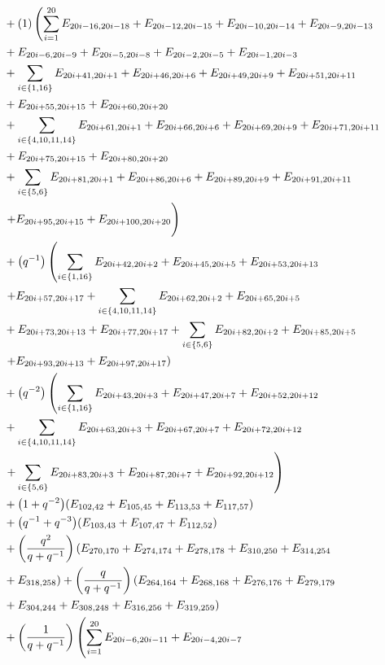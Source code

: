 \documentclass[10pt,a4paper]{amsart}
\numberwithin{equation}{section}
\theoremstyle{definition}
\begin{document}
\begin{align*}
&+(1)\left( \sum_{i=1}^{20} E_{20i-16,20i-18} + E_{20i-12,20i-15} + E_{20i-10,20i-14} + E_{20i-9,20i-13} \right. \\
&+ E_{20i-6,20i-9}+ E_{20i-5,20i-8} + E_{20i-2,20i-5} + E_{20i-1,20i-3}\\
&+\sum_{i \in \{1,16\}} E_{20i+41,20i+1} + E_{20i+46,20i+6} + E_{20i+49,20i+9} + E_{20i+51,20i+11} \\
&+ E_{20i+55,20i+15}+E_{20i+60,20i+20} \\
&+\sum_{i \in \{4,10,11,14\}} E_{20i+61,20i+1} + E_{20i+66,20i+6} + E_{20i+69,20i+9} + E_{20i+71,20i+11} \\
& + E_{20i+75,20i+15}+E_{20i+80,20i+20} \\
&+\sum_{i \in \{5,6\}} E_{20i+81,20i+1} + E_{20i+86,20i+6} + E_{20i+89,20i+9} + E_{20i+91,20i+11} \\
&\left.+ E_{20i+95,20i+15}+E_{20i+100,20i+20} \vphantom{\sum_{i=1}^{20}}\right) \\
&+\bigl(q^{-1}\bigr)\left( \sum_{i \in \{1,16\}} E_{20i+42,20i+2} + E_{20i+45,20i+5} + E_{20i+53,20i+13} \right.\\
&\left. + E_{20i+57,20i+17}+\sum_{i \in \{4,10,11,14\}} E_{20i+62,20i+2} + E_{20i+65,20i+5} \right.\\
&+ E_{20i+73,20i+13} + E_{20i+77,20i+17} +\sum_{i \in \{5,6\}} E_{20i+82,20i+2} + E_{20i+85,20i+5} \\
&\left.+ E_{20i+93,20i+13} + E_{20i+97,20i+17} \right) \\
&+\bigl(q^{-2}\bigr)\left( \sum_{i \in \{1,16\}} E_{20i+43,20i+3} + E_{20i+47,20i+7} + E_{20i+52,20i+12}\right.\\
&+\sum_{i \in \{4,10,11,14\}} E_{20i+63,20i+3} + E_{20i+67,20i+7} + E_{20i+72,20i+12} \\
&\left. +\sum_{i \in \{5,6\}} E_{20i+83,20i+3} + E_{20i+87,20i+7} + E_{20i+92,20i+12} \right) \\
&+\bigl(1 + q^{-2}\bigr)(E_{102,42}+E_{105,45}+E_{113,53}+E_{117,57})\\
&+\bigl(q^{-1} + q^{-3}\bigr)(E_{103,43}+E_{107,47}+E_{112,52})\\
&+\left(\frac{q^2}{q + q^{-1}}\right)(E_{270,170}+E_{274,174}+E_{278,178}+E_{310,250}+E_{314,254}\\
&+E_{318,258})+\left(\frac{q}{q + q^{-1}}\right)(E_{264,164}+E_{268,168}+E_{276,176}+E_{279,179}\\
&+E_{304,244}+E_{308,248}+E_{316,256}+E_{319,259})\\
&+\left(\frac{1}{q + q^{-1}}\right)\left( \sum_{i=1}^{20} E_{20i-6,20i-11} + E_{20i-4,20i-7} \vphantom{\sum_{j \in \{1,6,9,11,15,20\}}}\right.\\

\end{align*}
\end{document}
